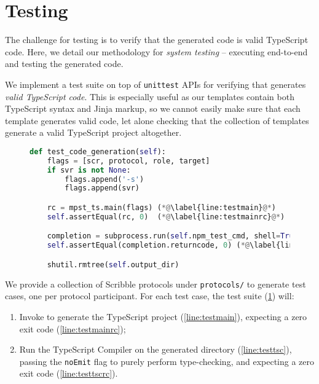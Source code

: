 \section{Testing}
The challenge for testing \codegen
is to verify that the generated code is valid
TypeScript code.
Here, we detail our methodology
for \textit{system testing} -- 
executing \codegen end-to-end and testing
the generated code.

We implement a test suite on top of \texttt{unittest} APIs
for verifying that \codegen
generates \textit{valid TypeScript code}. This is especially useful as
our templates contain both TypeScript syntax and Jinja markup, 
so we cannot easily make sure that each template generates valid code,
let alone checking that the collection of templates generate a valid
TypeScript project altogether.

\begin{figure}[!ht]
\begin{lstlisting}[language=python,tabsize=4]
def test_code_generation(self):
	flags = [scr, protocol, role, target]
	if svr is not None:
		flags.append('-s')
		flags.append(svr)

	rc = mpst_ts.main(flags) (*@\label{line:testmain}@*)
	self.assertEqual(rc, 0)  (*@\label{line:testmainrc}@*)

	completion = subprocess.run(self.npm_test_cmd, shell=True) (*@\label{line:testtsc}@*)
	self.assertEqual(completion.returncode, 0) (*@\label{line:testtscrc}@*)

	shutil.rmtree(self.output_dir)
\end{lstlisting}
\label{lst:systemtest}
\end{figure}

We provide a collection of Scribble protocols under \texttt{protocols/}
to generate test cases, one per protocol participant.
For each test case, the test suite (\cref{lst:systemtest}) will:

\begin{enumerate}
\item Invoke  to generate the TypeScript project 
(\cref{line:testmain}), 
expecting a zero exit code (\cref{line:testmainrc});
\item Run the TypeScript Compiler on the generated directory 
(\cref{line:testtsc}),
passing the \texttt{noEmit} flag to purely perform type-checking,
and expecting a zero exit code (\cref{line:testtscrc}).
\end{enumerate}

